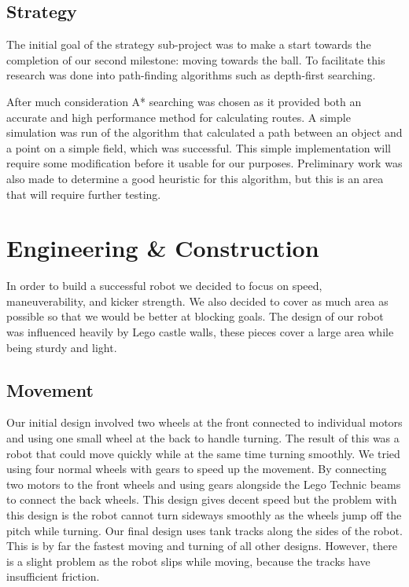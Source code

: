 \documentclass[12pt, a4paper, titlepage]{article}
\begin{document}
\subsection{Strategy}

The initial goal of the strategy sub-project was to make a start towards the
completion of our second milestone: moving towards the ball. To facilitate this
research was done into path-finding algorithms such as depth-first searching.

After much consideration A* searching was chosen as it provided both an accurate
and high performance method for calculating routes. A simple simulation was
run of the algorithm that calculated a path between an object and a point on a
simple field, which was successful. This simple implementation will require some
modification before it usable for our purposes. Preliminary work was also made
to determine a good heuristic for this algorithm, but this is an area that will
require further testing.

\section{Engineering \& Construction}

In order to build a successful robot we decided to focus on speed,
maneuverability, and kicker strength. We also decided to cover as much area as
possible so that we would be better at blocking goals. The design of our robot
was influenced heavily by Lego castle walls, these pieces cover a large area
while being sturdy and light.

\subsection{Movement}

Our initial design involved two wheels at the front connected to individual
motors and using one small wheel at the back to handle turning. The result
of this was a robot that could move quickly while at the same time turning
smoothly. We tried using four normal wheels with gears to speed up the movement.
By connecting two motors to the front wheels and using gears alongside the
Lego Technic beams to connect the back wheels. This design gives decent speed
but the problem with this design is the robot cannot turn sideways smoothly as
the wheels jump off the pitch while turning. Our final design uses tank tracks
along the sides of the robot. This is by far the fastest moving and turning of
all other designs. However, there is a slight problem as the robot slips while
moving, because the tracks have insufficient friction.
\end{document}

